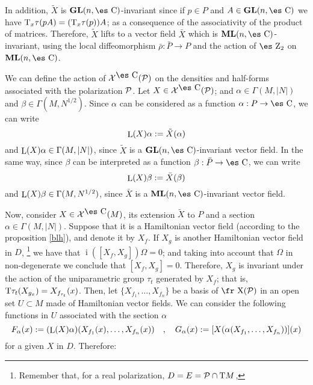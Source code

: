 \documentclass[12pt]{article}
\def\vf{\mbox{\fr X}}
\def\P{{\cal P}}
\def\GL{{\bf GL}(n,\Complex )}
\def\ML{{\bf ML}(n,\Complex )}
\def\Zahl{\mbox{\es Z}}
\def\Complex{\mbox{\es C}}
\def\inn{\mathop{i}\nolimits}
\def\Tan{{\rm T}}
\def\Lie{\mathop{\rm L}\nolimits}
\begin{document}
 In addition, $\tilde X$ is $\GL$-invariant since
 if $p \in P$ and $A \in\GL$ we have
$\Tan_x \tau (pA) = (\Tan_x \tau (p))A$;
as a consequence of the associativity of the product of matrices.
Therefore, $\tilde X$ lifts to a vector field $\bar X$ which is
$\ML$-invariant,
using the local diffeomorphism $\bar\rho:\bar P \to P$
and the action of $\Zahl_2$ on $\ML$.

We can define the action of ${\cal X}^{\Complex}({\cal P})$ on the
densities and half-forms
associated with the polarization ${\cal P}$.
Let $X \in {\cal X}^{\Complex}({\cal P})$; and
$\alpha \in \Gamma (M,| N | )$ and $\beta \in \Gamma (M,N^{1/2})$.
Since $\alpha$ can be considered as a function $\alpha : P \to
\Complex$, we can write
$$
\Lie(X)\alpha:=\tilde X(\alpha )
$$
and $\Lie(X)\alpha \in \Gamma (M,| N | )$,
since $\tilde X$ is a $\GL$-invariant vector field.
In the same way, since $\beta$ can be interpreted as a function
$\beta :\bar P \to \Complex$, we can write
$$
\Lie(X)\beta :=\bar X(\beta )
$$
and $\Lie(X)\beta \in \Gamma (M,N^{1/2})$,
since $\bar X$ is a $\ML$-invariant vector field.

Now, consider $X \in {\cal X}^{\Complex}(M)$, its extension $\tilde X$
to $P$ and
a section $\alpha\in\Gamma (M,| N | )$.
Suppose that it is a Hamiltonian vector field (according to the
proposition \ref{blh}),
and denote it by $X_f$.
If $X_g$ is another Hamiltonian vector field in $D$,%
\footnote{
Remember that, for a real polarization, $D=E=\P\cap\Tan M$,
}
we have that
$\inn([X_f,X_g])\Omega =0$;
and taking into account that $\Omega$ in non-degenerate
we conclude that $[X_f,X_g]=0$.
Therefore, $X_g$ is invariant under the action
of the uniparametric group $\tau_t$ generated by $X_f$;
that is, $\Tan\tau_t(X_{g_x})=X_{f_{\tau_t}}(x)$.
Then, let $\{ X_{f_1},\ldots ,X_{f_n}\}$ be
a basis of $\vf ({\cal P})$ in an open set $U \subset M$
made of Hamiltonian vector fields.
We can consider the following functions in $U$
associated with the section $\alpha$
$$
F_{\alpha}(x) := (\Lie(X)\alpha )(X_{f_1}(x),\ldots ,X_{f_n}(x))
\quad , \quad
G_{\alpha}(x) := [X(\alpha(X_{f_1},\ldots ,X_{f_n}))](x)
$$
for a given $X$ in $D$. Therefore:
\end{document}
